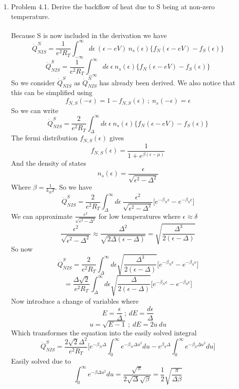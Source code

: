 \documentclass[12pt]{article}
\begin{document}
\begin{enumerate}
    \item Problem 4.1. Derive the backflow of heat due to S being at non-zero temperature. \\
    \\
    Because S is now included in the derivation we have 
    $$ \dot{Q}_{NIS}^N = \frac{1}{e^2 R_T} \int_{-\infty}^{\infty} d \epsilon \ (\epsilon - eV) \ n_s (\epsilon) \{f_N (\epsilon - eV) - f_S (\epsilon)\} $$
    $$ \dot{Q}^S_{NIS} = \frac{1}{e^2 R_T} \int_{-\infty}^{\infty} d \epsilon  \ \epsilon  \ n_s (\epsilon) \{f_N (\epsilon - eV) - f_S (\epsilon)\} $$
    So we consider $\dot{Q}^S_{NIS}$ as $\dot{Q}_{NIS}^N$ has already been derived. We also notice that this can be simplified using 
    $$ f_{N,S} (-\epsilon) = 1- f_{N,S} (\epsilon) \ ; \ n_s (-\epsilon) = \epsilon $$
    So we can write 
    $$ \dot{Q}^S_{NIS} = \frac{2}{e^2 R_T} \int_{\Delta}^{\infty} d \epsilon  \ \epsilon \ n_s (\epsilon) \{f_N (\epsilon - eV) - f_S (\epsilon)\} $$
    The fermi distribution $f_{N,S} (\epsilon)$ gives 
    $$ f_{N,S} (\epsilon) = \frac{1}{1+e^{\beta( \epsilon - \mu)}} $$
    And the density of states 
    $$ n_s (\epsilon) = \frac{\epsilon}{\sqrt{\epsilon^2 - \Delta^2}} $$
    Where $\beta = \frac{1}{k_B T}$. So we have 
    $$ \dot{Q}^S_{NIS} =  \frac{2}{e^2 R_T} \int_{\Delta}^{\infty} d \epsilon  \ \frac{\epsilon^2}{\sqrt{\epsilon^2 - \Delta^2}} \Big[ e^{-\beta_N \epsilon} - e^{-\beta_S \epsilon}\Big] $$
    We can approximate $\frac{\epsilon^2}{\sqrt{\epsilon^2 - \Delta^2}}$ for low temperatures where $\epsilon \approx \delta$
    $$ \frac{\epsilon^2}{\sqrt{\epsilon^2 - \Delta^2}} \approx \frac{\Delta^2}{\sqrt{2 \Delta( \epsilon - \Delta)}} = \sqrt{\frac{\Delta^3}{2(\epsilon - \Delta)}} $$
    So now 
    $$ \dot{Q}^S_{NIS} = \frac{2}{e^2 R_T} \int_{\Delta}^{\infty} d \epsilon \sqrt{\frac{\Delta^3}{2(\epsilon - \Delta)}} \Big[ e^{-\beta_N \epsilon} - e^{-\beta_S \epsilon}\Big] $$
    $$ = \frac{\Delta \sqrt{2}}{e^2 R_T} \int_{\Delta}^{\infty} d \epsilon \sqrt{\frac{\Delta}{2(\epsilon - \Delta)}} \Big[ e^{-\beta_N \epsilon} - e^{-\beta_S \epsilon}\Big] $$
    Now introduce a change of variables where 
    $$ E = \frac{\epsilon}{\Delta} \ ; \ dE = \frac{d \epsilon}{\Delta} $$
    $$ u = \sqrt{E-1} \ ; \ dE = 2u \ du $$
    Which transformes the equation into the easily solved integral 
    $$ \dot{Q}^S_{NIS} = \frac{2 \sqrt{2} \Delta^2}{e^2 R_T} \Big[e^{-\beta_N \Delta}\int_0^{\infty} e^{-\beta_N \Delta u^2} du - e^{\beta_S \Delta} \int_0^{\infty} e^{-\beta_S \Delta u^2} du \Big] $$
    Easily solved due to 
    $$ \int_0^{\infty} e^{-\beta \Delta u^2} du = \frac{\sqrt{\pi}}{2 \sqrt{\Delta} \sqrt{\beta}} = \frac{1}{2} \sqrt{\frac{\pi}{\Delta \beta}} $$

\end{enumerate}
\end{document}
